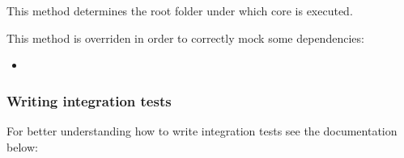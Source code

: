 \documentclass[letterpaper,10pt,english]{sphinxmanual}
\begin{document}
\begin{fulllineitems}
\begin{fulllineitems}
\label{get_started/contribute:fantastico.tests.base_case.FantasticoUnitTestsCase._get_root_folder}
This method determines the root folder under which core is executed.

\end{fulllineitems}


\begin{fulllineitems}
\label{get_started/contribute:fantastico.tests.base_case.FantasticoUnitTestsCase.setup_once}
This method is overriden in order to correctly mock some dependencies:
\begin{itemize}
\item {} 
{\hyperref[features/mvc:fantastico.mvc.controller_decorators.Controller]{}}

\end{itemize}

\end{fulllineitems}


\end{fulllineitems}



\subsubsection{Writing integration tests}
\label{get_started/contribute:writing-integration-tests}
For better understanding how to write integration tests see the documentation below:
\end{document}

